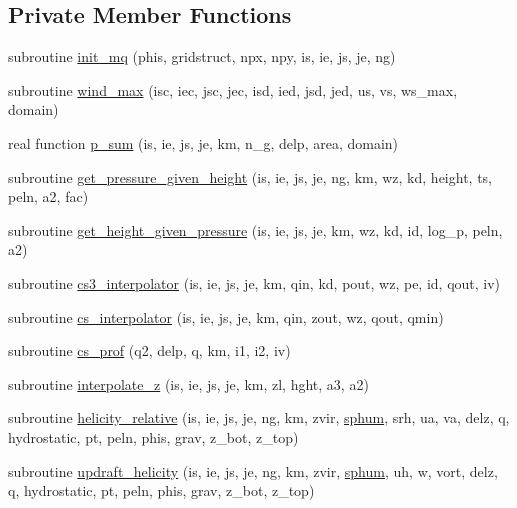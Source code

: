 \subsection*{Private Member Functions}
\begin{DoxyCompactItemize}
\item 
subroutine \hyperlink{classfv__diagnostics__mod_a483ff3562b111042cf6ae2d8f1874410}{init\-\_\-mq} (phis, gridstruct, npx, npy, is, ie, js, je, ng)
\item 
subroutine \hyperlink{classfv__diagnostics__mod_ab09acb046e5dfb2e8989b79dffaef90b}{wind\-\_\-max} (isc, iec, jsc, jec, isd, ied, jsd, jed, us, vs, ws\-\_\-max, domain)
\item 
real function \hyperlink{classfv__diagnostics__mod_a1440b8390a2e8aaa1e109cba46276699}{p\-\_\-sum} (is, ie, js, je, km, n\-\_\-g, delp, area, domain)
\item 
subroutine \hyperlink{classfv__diagnostics__mod_a395fe8d124bf687058babbf508632b0b}{get\-\_\-pressure\-\_\-given\-\_\-height} (is, ie, js, je, ng, km, wz, kd, height, ts, peln, a2, fac)
\item 
subroutine \hyperlink{classfv__diagnostics__mod_a83dc5abf00b52139d1570683edfb34d4}{get\-\_\-height\-\_\-given\-\_\-pressure} (is, ie, js, je, km, wz, kd, id, log\-\_\-p, peln, a2)
\item 
subroutine \hyperlink{classfv__diagnostics__mod_ab908b9bfb62dab6cd8ba5341099041ae}{cs3\-\_\-interpolator} (is, ie, js, je, km, qin, kd, pout, wz, pe, id, qout, iv)
\item 
subroutine \hyperlink{classfv__diagnostics__mod_a610855b6569014001c5c9f78c8581b50}{cs\-\_\-interpolator} (is, ie, js, je, km, qin, zout, wz, qout, qmin)
\item 
subroutine \hyperlink{classfv__diagnostics__mod_a472336d75d0422fadf83870447b8b7a1}{cs\-\_\-prof} (q2, delp, q, km, i1, i2, iv)
\item 
subroutine \hyperlink{classfv__diagnostics__mod_ada3da4b64b0efc06180b7b3b83438a4b}{interpolate\-\_\-z} (is, ie, js, je, km, zl, hght, a3, a2)
\item 
subroutine \hyperlink{classfv__diagnostics__mod_a80c3a3ff4c8f119f5f85eb1b99731f12}{helicity\-\_\-relative} (is, ie, js, je, ng, km, zvir, \hyperlink{classfv__diagnostics__mod_a60dad9285aa4277546ef49434b1d9362}{sphum}, srh, ua, va, delz, q, hydrostatic, pt, peln, phis, grav, z\-\_\-bot, z\-\_\-top)
\item 
subroutine \hyperlink{classfv__diagnostics__mod_a179615c9545b374ba227409740a8f5f6}{updraft\-\_\-helicity} (is, ie, js, je, ng, km, zvir, \hyperlink{classfv__diagnostics__mod_a60dad9285aa4277546ef49434b1d9362}{sphum}, uh, w, vort, delz, q, hydrostatic, pt, peln, phis, grav, z\-\_\-bot, z\-\_\-top)

\end{DoxyCompactItemize}
